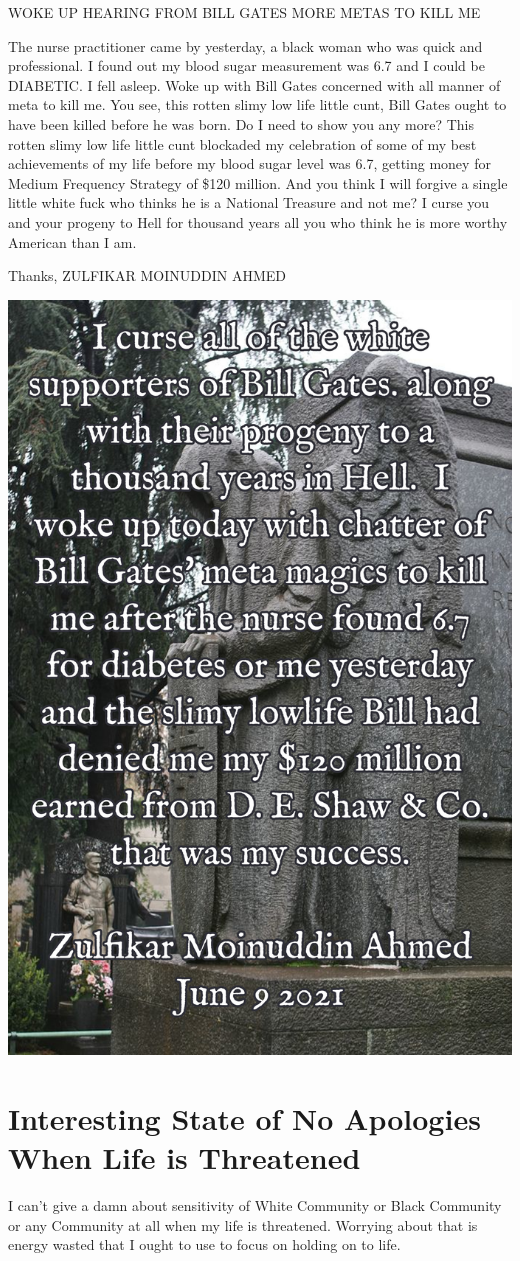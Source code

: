 \documentclass{amsart}
\begin{document}
WOKE UP HEARING FROM BILL GATES MORE METAS TO KILL ME


The nurse practitioner came by yesterday, a black woman who was quick and professional.  I found out my blood sugar measurement was 6.7 and I could be DIABETIC.  I fell asleep.  Woke up with Bill Gates concerned with all manner of meta to kill me.  You see, this rotten slimy low life little cunt, Bill Gates ought to have been killed before he was born.  Do I need to show you any more?  This rotten slimy low life little cunt blockaded my celebration of some of my best achievements of my life before my blood sugar level was 6.7, getting money for Medium Frequency Strategy of \$120 million.  And you think I will forgive a single little white fuck who thinks he is a National Treasure and not me?  I curse you and your progeny to Hell for thousand years all you who think he is more worthy American than I am.

Thanks,
ZULFIKAR MOINUDDIN AHMED

\includegraphics[scale=0.4]{diabetes.jpg}

\section{Interesting State of No Apologies When Life is Threatened}

I can't give a damn about sensitivity of White Community or Black Community or any Community at all when my life is threatened.  Worrying about that is energy wasted that I ought to use to focus on holding on to life.
\end{document}
